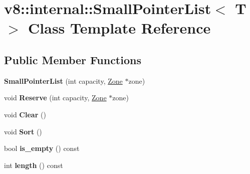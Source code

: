 \hypertarget{classv8_1_1internal_1_1_small_pointer_list}{}\section{v8\+:\+:internal\+:\+:Small\+Pointer\+List$<$ T $>$ Class Template Reference}
\label{classv8_1_1internal_1_1_small_pointer_list}
\subsection*{Public Member Functions}
\begin{DoxyCompactItemize}
\item 
\hypertarget{classv8_1_1internal_1_1_small_pointer_list_a2016d502c30d5e0d1ef3e16aed421553}{}{\bfseries Small\+Pointer\+List} (int capacity, \hyperlink{classv8_1_1internal_1_1_zone}{Zone} $\ast$zone)\label{classv8_1_1internal_1_1_small_pointer_list_a2016d502c30d5e0d1ef3e16aed421553}

\item 
\hypertarget{classv8_1_1internal_1_1_small_pointer_list_a340f38f2f4e23d775f0ab9f77ae0f316}{}void {\bfseries Reserve} (int capacity, \hyperlink{classv8_1_1internal_1_1_zone}{Zone} $\ast$zone)\label{classv8_1_1internal_1_1_small_pointer_list_a340f38f2f4e23d775f0ab9f77ae0f316}

\item 
\hypertarget{classv8_1_1internal_1_1_small_pointer_list_ae880d721f281d63120ae6f6190617030}{}void {\bfseries Clear} ()\label{classv8_1_1internal_1_1_small_pointer_list_ae880d721f281d63120ae6f6190617030}

\item 
\hypertarget{classv8_1_1internal_1_1_small_pointer_list_a9ffb1bc5a807fc012a6d006689dd6d70}{}void {\bfseries Sort} ()\label{classv8_1_1internal_1_1_small_pointer_list_a9ffb1bc5a807fc012a6d006689dd6d70}

\item 
\hypertarget{classv8_1_1internal_1_1_small_pointer_list_af526d8806666c0dce9101cf82cb34ff3}{}bool {\bfseries is\+\_\+empty} () const \label{classv8_1_1internal_1_1_small_pointer_list_af526d8806666c0dce9101cf82cb34ff3}

\item 
\hypertarget{classv8_1_1internal_1_1_small_pointer_list_a789f7870d6814b33dc60cee5e5e3b02a}{}int {\bfseries length} () const \label{classv8_1_1internal_1_1_small_pointer_list_a789f7870d6814b33dc60cee5e5e3b02a}


\end{DoxyCompactItemize}
